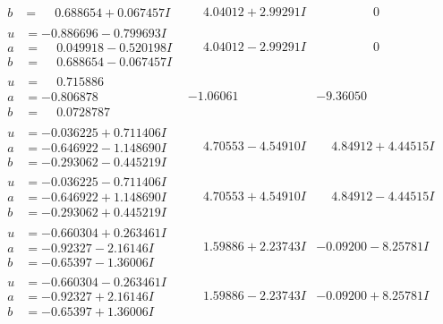 \documentclass[1p]{elsarticle_modified}
\theoremstyle{definition}
\begin{document}
$$\begin{array}{c|c|c}
\begin{aligned}
b &= \phantom{-}0.688654 + 0.067457 I\end{aligned}
 & \phantom{-}4.04012 + 2.99291 I & \phantom{-0.000000 } 0 \\ \hline\begin{aligned}
u &= -0.886696 - 0.799693 I \\
a &= \phantom{-}0.049918 - 0.520198 I \\
b &= \phantom{-}0.688654 - 0.067457 I\end{aligned}
 & \phantom{-}4.04012 - 2.99291 I & \phantom{-0.000000 } 0 \\ \hline\begin{aligned}
u &= \phantom{-}0.715886\phantom{ +0.000000I} \\
a &= -0.806878\phantom{ +0.000000I} \\
b &= \phantom{-}0.0728787\phantom{ +0.000000I}\end{aligned}
 & -1.06061\phantom{ +0.000000I} & -9.36050\phantom{ +0.000000I} \\ \hline\begin{aligned}
u &= -0.036225 + 0.711406 I \\
a &= -0.646922 - 1.148690 I \\
b &= -0.293062 - 0.445219 I\end{aligned}
 & \phantom{-}4.70553 - 4.54910 I & \phantom{-}4.84912 + 4.44515 I \\ \hline\begin{aligned}
u &= -0.036225 - 0.711406 I \\
a &= -0.646922 + 1.148690 I \\
b &= -0.293062 + 0.445219 I\end{aligned}
 & \phantom{-}4.70553 + 4.54910 I & \phantom{-}4.84912 - 4.44515 I \\ \hline\begin{aligned}
u &= -0.660304 + 0.263461 I \\
a &= -0.92327 - 2.16146 I \\
b &= -0.65397 - 1.36006 I\end{aligned}
 & \phantom{-}1.59886 + 2.23743 I & -0.09200 - 8.25781 I \\ \hline\begin{aligned}
u &= -0.660304 - 0.263461 I \\
a &= -0.92327 + 2.16146 I \\
b &= -0.65397 + 1.36006 I\end{aligned}
 & \phantom{-}1.59886 - 2.23743 I & -0.09200 + 8.25781 I \\ \hline\begin{aligned}

\end{aligned}
\end{array}$$
\end{document}
